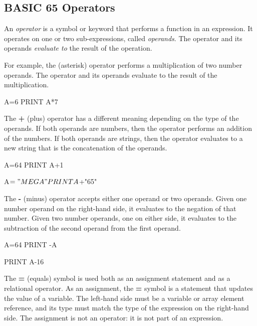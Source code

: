 \subsection{BASIC 65 Operators}

An {\em operator} is a symbol or keyword that performs a function in an expression. It operates on one or two sub-expressions, called {\em operands}. The operator and its operands {\em evaluate to} the result of the operation.

For example, the {\bf *} (asterisk) operator performs a multiplication of two number operands. The operator and its operands evaluate to the result of the multiplication.

\begin{screencode}
A=6
PRINT A*7
\end{screencode}

The {\bf +} (plus) operator has a different meaning depending on the type of the operands. If both operands are numbers, then the operator performs an addition of the numbers. If both operands are strings, then the operator evaluates to a new string that is the concatenation of the operands.

\begin{screencode}
A=64
PRINT A+1

A$="MEGA"
PRINT A$+"65"
\end{screencode}

The {\bf -} (minus) operator accepts either one operand or two operands. Given one number operand on the right-hand side, it evaluates to the negation of that number. Given two number operands, one on either side, it evaluates to the subtraction of the second operand from the first operand.

\begin{screencode}
A=64
PRINT -A

PRINT A-16
\end{screencode}

The {\bf =} (equals) symbol is used both as an assignment statement and as a relational operator. As an assignment, the {\bf =} symbol is a statement that updates the value of a variable. The left-hand side must be a variable or array element reference, and its type must match the type of the expression on the right-hand side. The assignment is not an operator: it is not part of an expression.


